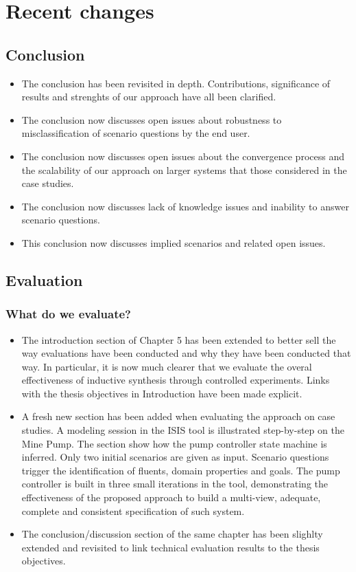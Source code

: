 \chapter*{Recent changes}

\section*{Conclusion}

\begin{itemize}
\item The conclusion has been revisited in depth. Contributions, significance of 
      results and strenghts of our approach have all been clarified.
\item The conclusion now discusses open issues about robustness to
      misclassification of scenario questions by the end user.
\item The conclusion now discusses open issues about the convergence process and 
      the scalability of our approach on larger systems that those considered in
      the case studies.
\item The conclusion now discusses lack of knowledge issues and inability to 
      answer scenario questions.
\item This conclusion now discusses implied scenarios and related open issues.
\end{itemize}

\section*{Evaluation}

\subsection*{What do we evaluate?}

\begin{itemize}
\item The introduction section of Chapter 5 has been extended to better sell the 
    way evaluations have been conducted and why they have been conducted that 
    way. In particular, it is now much clearer that we evaluate the overal 
    effectiveness of inductive synthesis through controlled experiments. 
    Links with the thesis objectives in Introduction have been made explicit.
\item A fresh new section has been added when evaluating the approach on case 
    studies. A modeling session in the ISIS tool is illustrated step-by-step on
    the Mine Pump. The section show how the pump controller state machine is 
    inferred. Only two initial scenarios are given as input. Scenario questions
    trigger the identification of fluents, domain properties and goals. The pump
    controller is built in three small iterations in the tool, demonstrating the
    effectiveness of the proposed approach to build a multi-view, adequate, 
    complete and consistent specification of such system.
\item The conclusion/discussion section of the same chapter has been slighlty 
    extended and revisited to link technical evaluation results to the thesis
    objectives.
\end{itemize}

